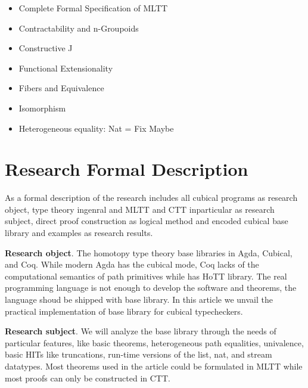 \documentclass{svproc}
\begin{document}
\begin{itemize}
\item Complete Formal Specification of MLTT
\item Contractability and n-Groupoids
\item Constructive J
\item Functional Extensionality
\item Fibers and Equivalence
\item Isomorphism
\item Heterogeneous equality: Nat = Fix Maybe
\end{itemize}

\section{Research Formal Description}

As a formal description of the research includes all cubical programs as research object,
type theory ingenral and MLTT and CTT inparticular as research subject,
direct proof construction as logical method and encoded cubical
base library and examples as research results.

{\bf Research object}. The homotopy type theory base libraries in Agda, Cubical, and Coq.
While modern Agda has the cubical mode, Coq lacks of the computational semantics of path primitives
while has HoTT library. The real programming language is not enough to
develop the software and theorems, the language shoud be shipped with base library. In this article
we unvail the practical implementation of base library for cubical typecheckers.

{\bf Research subject}. We will analyze the base library through the needs of particular features,
like basic theorems, heterogeneous path equalities, univalence, basic HITs like truncations, run-time
versions of the list, nat, and stream datatypes. Most theorems used in the article
could be formulated in MLTT while most proofs can only be constructed in CTT.
\end{document}

